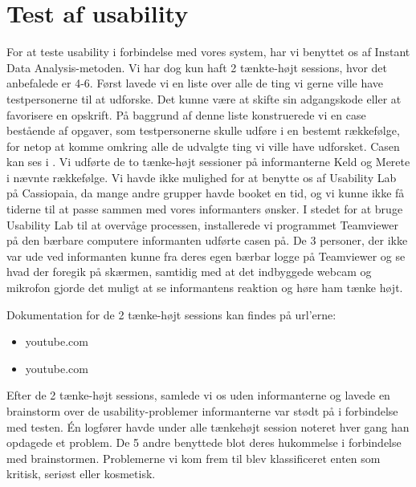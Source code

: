 \section{Test af usability}
\label{sec:usability}

For at teste usability i forbindelse med vores system, har vi benyttet os af Instant Data Analysis-metoden\cite{debida}. Vi har dog kun haft 2 tænkte-højt sessions, hvor det anbefalede er 4-6. Først lavede vi en liste over alle de ting vi gerne ville have testpersonerne til at udforske. Det kunne \fx være at skifte sin adgangskode eller at favorisere en opskrift. På baggrund af denne liste konstruerede vi en case bestående af opgaver, som testpersonerne skulle udføre i en bestemt rækkefølge, for netop at komme omkring alle de udvalgte ting vi ville have udforsket. Casen kan ses i . Vi udførte de to tænke-højt sessioner på informanterne Keld og Merete i nævnte rækkefølge. Vi havde ikke mulighed for at benytte os af Usability Lab på Cassiopaia, da mange andre grupper havde booket en tid, og vi kunne ikke få tiderne til at passe sammen med vores informanters ønsker. I stedet for at bruge Usability Lab til at overvåge processen, installerede vi programmet Teamviewer på den bærbare computere informanten udførte casen på. De 3 personer, der ikke var ude ved informanten kunne fra deres egen bærbar logge på Teamviewer og se hvad der foregik på skærmen, samtidig med at det indbyggede webcam og mikrofon gjorde det muligt at se informantens reaktion og høre ham tænke højt.

Dokumentation for de 2 tænke-højt sessions kan findes på url'erne:
\begin{itemize}[noitemsep]
\item youtube.com
\item youtube.com
\end{itemize}

Efter de 2 tænke-højt sessions, samlede vi os uden informanterne og lavede en brainstorm over de usability-problemer informanterne var stødt på i forbindelse med testen. Én logfører havde under alle tænkehøjt session noteret hver gang han opdagede et problem. De 5 andre benyttede blot deres hukommelse i forbindelse med brainstormen. Problemerne vi kom frem til blev klassificeret enten som kritisk, seriøst eller kosmetisk.

